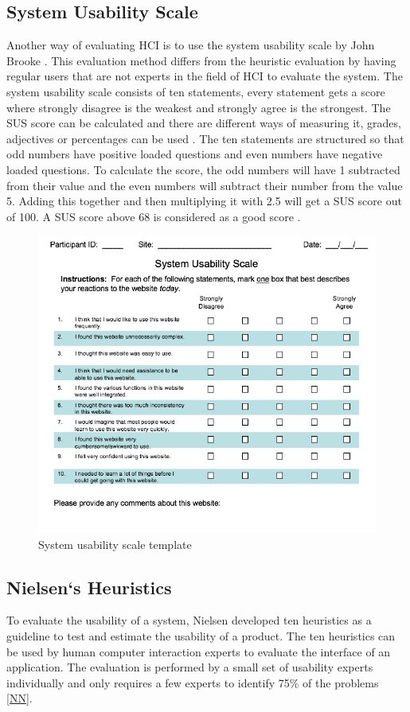 \subsection{System Usability Scale}
Another way of evaluating HCI is to use the system usability scale by John Brooke \cite{Brooke}. This evaluation method differs from the heuristic evaluation by having regular users that are not experts in the field of HCI to evaluate the system. The system usability scale consists of ten statements, every statement gets a score where strongly disagree is the weakest and strongly agree is the strongest.
The SUS score can be calculated and there are different ways of measuring it, grades, adjectives or percentages can be used \cite{doi:10.1080/10447318.2018.1455307} . The ten statements are structured so that odd numbers have positive loaded questions and even numbers have negative loaded questions. To calculate the score, the odd numbers will have 1 subtracted from their value and the even numbers will subtract their number from the value 5. Adding this together and then multiplying it with 2.5 will get a SUS score out of 100. A SUS score above 68 is considered as a good score \cite{doi:10.1080/10447318.2018.1455307}. 
\begin{figure}[H]
    \centering
    \includegraphics[width=120mm]{figures/sus-template.png}
    \caption{System usability scale template}
\end{figure}


\subsection{Nielsen`s Heuristics} \label{nielsen}
To evaluate the usability of a system, Nielsen \cite{Nngroup} developed ten heuristics as a guideline to test and estimate the usability of a product. The ten heuristics can be used by human computer interaction experts to evaluate the interface of an application. The evaluation is performed by a small set of usability experts individually and only requires a few experts to identify 75\% of the problems \ref{NN}.

